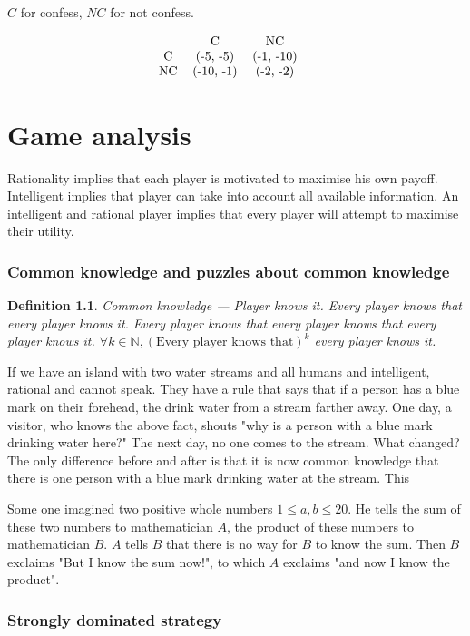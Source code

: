 \documentclass[11pt]{book}
\newcommand{\N}{\ensuremath{\mathbb{N}}}
\newtheorem{definition}{Definition}
\begin{document}
$C$ for confess, $NC$ for not confess.

$$
\begin{tabular}{ccccc}
     & C & NC & \\
    C & (-5, -5) & (-1, -10) \\ 
    NC &  (-10, -1) & (-2, -2)
\end{tabular}
$$

\chapter{Game analysis}
Rationality implies that each player is motivated to maximise his own payoff.
Intelligent implies that player can take into account all available
information. An intelligent and rational player implies that every player will
attempt to maximise their utility.

\subsection{Common knowledge and puzzles about common knowledge}
\begin{definition}
    \emph{Common knowledge} --- Player knows it. Every player knows that every player
    knows it. Every player knows that every player knows that
    every player knows it.
    $\forall k \in \N, (\text{Every player knows that})^k$ every player knows it.
\end{definition}

If we have an island with two water streams and all humans and intelligent,
rational and cannot speak. They have a rule that says that if a person has a
blue mark on their forehead, the drink water from a stream farther away. One
day, a visitor, who knows the above fact, shouts "why is a person with a blue
mark drinking water here?" The next day, no one comes to the stream. What changed?
The only difference before and after is that it is now common knowledge that
there is one person with a blue mark drinking water at the stream. This


Some one imagined two positive whole numbers $1 \leq a, b \leq 20$. He tells the sum of these
two numbers to mathematician $A$, the product of these numbers to mathematician $B$.
$A$ tells $B$ that there is no way for $B$ to know the sum. Then $B$ exclaims
"But I know the sum now!", to which $A$ exclaims "and now I know the product".

\subsection{Strongly dominated strategy}
\end{document}

